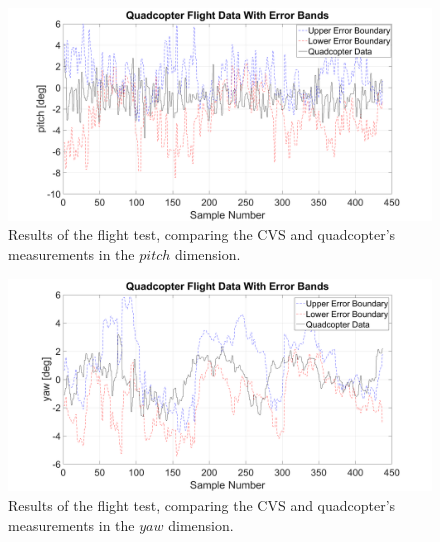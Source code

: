 \begin{figure}
  \centering
  \includegraphics[clip, trim = 80 0 100 0, width = \textwidth]{figures/chapter5/ts_pitch}
  \caption{Results of the flight test, comparing the CVS and quadcopter's measurements in the $pitch$ dimension.}
\end{figure}

\begin{figure}
  \centering
  \includegraphics[clip, trim = 80 0 100 0, width = \textwidth]{figures/chapter5/ts_yaw}
  \caption{Results of the flight test, comparing the CVS and quadcopter's measurements in the $yaw$ dimension.}
  \label{fig:chap5-results-yaw}
\end{figure}
  
